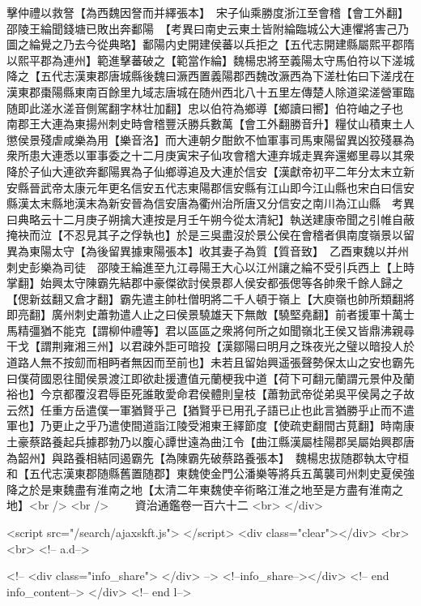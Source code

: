 擊仲禮以救詧【為西魏因詧而并繹張本】　宋子仙乘勝度浙江至會稽【會工外翻】邵陵王綸聞錢塘已敗出奔鄱陽　【考異曰南史云東土皆附綸臨城公大連懼將害己乃圖之綸覺之乃去今從典略】鄱陽内史開建侯蕃以兵拒之【五代志開建縣屬熙平郡隋以熙平郡為連州】範進擊蕃破之【範當作綸】魏楊忠將至義陽太守馬伯符以下溠城降之【五代志漢東郡唐城縣後魏曰㵐西置義陽郡西魏改㵐西為下溠杜佑曰下溠戌在漢東郡棗陽縣東南百餘里九域志唐城在随州西北八十五里左傳楚人除道梁溠營軍臨随即此溠水溠音側駕翻字林壮加翻】忠以伯符為鄉導【鄉讀曰嚮】伯符岫之子也　南郡王大連為東揚州刺史時會稽豐沃勝兵數萬【會工外翻勝音升】糧仗山積東土人懲侯景殘虐咸樂為用【樂音洛】而大連朝夕酣飲不恤軍事司馬東陽留異凶狡殘暴為衆所患大連悉以軍事委之十二月庚寅宋子仙攻會稽大連弃城走異奔還鄉里尋以其衆降於子仙大連欲奔鄱陽異為子仙鄉導追及大連於信安【漢獻帝初平二年分太末立新安縣晉武帝太康元年更名信安五代志東陽郡信安縣有江山即今江山縣也宋白曰信安縣漢太末縣地漢末為新安晉為信安唐為衢州治所唐又分信安之南川為江山縣　考異曰典略云十二月庚子朔擒大連按是月壬午朔今從太清紀】執送建康帝聞之引帷自蔽掩袂而泣【不忍見其子之俘執也】於是三吳盡沒於景公侯在會稽者俱南度嶺景以留異為東陽太守【為後留異據東陽張本】收其妻子為質【質音致】　乙酉東魏以并州刺史彭樂為司徒　邵陵王綸進至九江尋陽王大心以江州讓之綸不受引兵西上【上時掌翻】始興太守陳霸先結郡中豪傑欲討侯景郡人侯安都張偲等各帥衆千餘人歸之【偲新兹翻又倉才翻】霸先遣主帥杜僧明將二千人頓于嶺上【大庾嶺也帥所類翻將即亮翻】廣州刺史蕭勃遣人止之曰侯景驍雄天下無敵【驍堅堯翻】前者援軍十萬士馬精彊猶不能克【謂柳仲禮等】君以區區之衆將何所之如聞嶺北王侯又皆鼎沸親尋干戈【謂荆雍湘三州】以君疎外詎可暗投【漢鄒陽曰明月之珠夜光之璧以暗投人於道路人無不按劎而相眄者無因而至前也】未若且留始興遥張聲勢保太山之安也霸先曰僕荷國恩往聞侯景渡江即欲赴援遭值元蘭梗我中道【荷下可翻元蘭謂元景仲及蘭裕也】今京都覆沒君辱臣死誰敢愛命君侯體則皇枝【蕭勃武帝從弟吳平侯昺之子故云然】任重方岳遣僕一軍猶賢乎己【猶賢乎已用孔子語已止也此言猶勝乎止而不遣軍也】乃更止之乎乃遣使間道詣江陵受湘東王繹節度【使疏吏翻間古莧翻】時南康土豪蔡路養起兵據郡勃乃以腹心譚世遠為曲江令【曲江縣漢屬桂陽郡吴屬始興郡唐為韶州】與路養相結同遏霸先【為陳霸先破蔡路養張本】　魏楊忠拔随郡執太守桓和【五代志漢東郡随縣舊置随郡】東魏使金門公潘樂等將兵五萬襲司州刺史夏侯強降之於是東魏盡有淮南之地【太清二年東魏使辛術略江淮之地至是方盡有淮南之地】<br />
<br />
　　資治通鑑卷一百六十二  <br>
   </div> 

<script src="/search/ajaxskft.js"> </script>
 <div class="clear"></div>
<br>
<br>
 <!-- a.d-->

 <!--
<div class="info_share">
</div> 
-->
 <!--info_share--></div>   <!-- end info_content-->
  </div> <!-- end l-->

